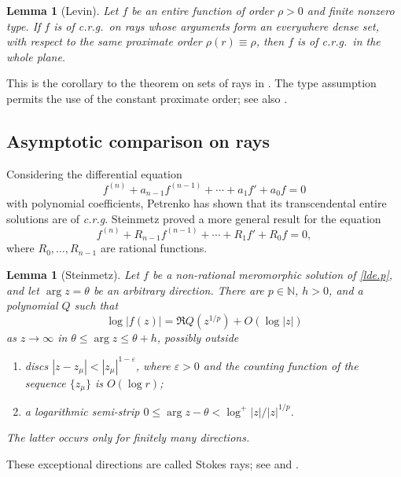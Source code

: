 \documentclass[a4paper,12pt]{article}
\newcommand{\N}{\mathbb{N}}
\newtheorem{lemma}[defin]{Lemma}
\numberwithin{equation}{section}
\begin{document}
\begin{lemma}[Levin]\label{lem.levin.lim.crg}
Let $f$ be an entire function of order $\rho>0$ and finite nonzero type.
If $f$ is of \textit{c.r.g.}\ on rays whose arguments form an
everywhere dense set, with respect to the same proximate order $\rho(r)\equiv\rho$,
then $f$ is of \textit{c.r.g.}\ in the whole plane.
\end{lemma}
This is the corollary to the theorem on sets of rays in
\cite[Chapter III, Section 1, pp.~140--142]{Levin1}.
The type assumption permits the use of the constant proximate order;
see also \cite[p.~32]{Levin1}.

\subsection{Asymptotic comparison on rays}\label{Sec.asym}
Considering the differential equation
\begin{equation}\label{lde}
 f^{(n)}+a_{n-1}f^{(n-1)}+\cdots+a_1f'+a_0f=0
\end{equation}
with polynomial coefficients, Petrenko \cite[pp.~104--112]{Petru}
has shown that its transcendental entire solutions are of \textit{c.r.g}.
Steinmetz \cite[Theorem 1]{Stein} proved a more general result for the equation
\begin{equation}\label{lde.p}
 f^{(n)}+R_{n-1}f^{(n-1)}+\cdots+R_1f'+R_0f=0,
\end{equation}
where $R_0,\ldots,R_{n-1}$ are rational functions.

\begin{lemma}[Steinmetz]\label{Thm1.stein}
Let $f$ be a non-rational meromorphic solution of \eqref{lde.p}, and let
$\arg z=\theta$ be an arbitrary direction. There are $p\in\N$, $h>0$,
and a polynomial $Q$ such that
\begin{equation}\label{eq.log|f|}
 \log|f(z)|=\Re Q(z^{1/p})+O(\log|z|)
\end{equation}
as $z\to\infty$ in $\theta\le\arg z\le\theta+h$, possibly outside
\begin{enumerate}
\item discs $|z-z_\mu|<|z_\mu|^{1-\varepsilon}$, where $\varepsilon>0$
and the counting function of the sequence $\{z_\mu\}$ is $O(\log r)$;
\item a logarithmic semi-strip
$0\le\arg z-\theta<\log^+|z|/|z|^{1/p}$.
\end{enumerate}
The latter occurs only for finitely many directions.
\end{lemma}
These exceptional directions are called Stokes rays; see \cite{Stein}
and \cite[Section 15]{Wasow}.
\end{document}
